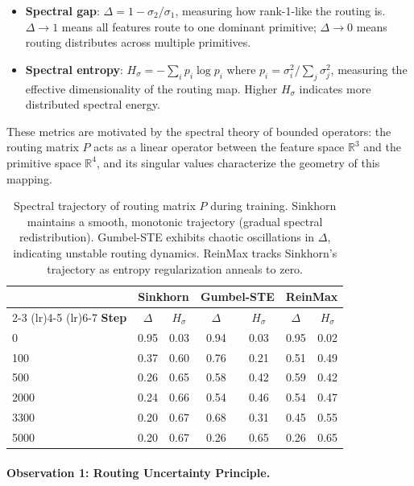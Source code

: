 \documentclass[Royal,times,sageh]{sagej}
\begin{document}
\begin{itemize}
    \item \textbf{Spectral gap}: $\Delta = 1 - \sigma_2 / \sigma_1$, measuring how rank-1-like the routing is. $\Delta \to 1$ means all features route to one dominant primitive; $\Delta \to 0$ means routing distributes across multiple primitives.
    \item \textbf{Spectral entropy}: $H_\sigma = -\sum_i p_i \log p_i$ where $p_i = \sigma_i^2 / \sum_j \sigma_j^2$, measuring the effective dimensionality of the routing map. Higher $H_\sigma$ indicates more distributed spectral energy.
\end{itemize}

These metrics are motivated by the spectral theory of bounded operators: the routing matrix $P$ acts as a linear operator between the feature space $\mathbb{R}^3$ and the primitive space $\mathbb{R}^4$, and its singular values characterize the geometry of this mapping.

\begin{table}[h]
\centering
\caption{Spectral trajectory of routing matrix $P$ during training. Sinkhorn maintains a smooth, monotonic trajectory (gradual spectral redistribution). Gumbel-STE exhibits chaotic oscillations in $\Delta$, indicating unstable routing dynamics. ReinMax tracks Sinkhorn's trajectory as entropy regularization anneals to zero.}
\label{tab:spectral_trajectory}
\small
\begin{tabular}{lcccccc}
\toprule
& \multicolumn{2}{c}{\textbf{Sinkhorn}} & \multicolumn{2}{c}{\textbf{Gumbel-STE}} & \multicolumn{2}{c}{\textbf{ReinMax}} \\
\cmidrule(lr){2-3} \cmidrule(lr){4-5} \cmidrule(lr){6-7}
\textbf{Step} & $\Delta$ & $H_\sigma$ & $\Delta$ & $H_\sigma$ & $\Delta$ & $H_\sigma$ \\
\midrule
0    & 0.95 & 0.03 & 0.94 & 0.03 & 0.95 & 0.02 \\
100  & 0.37 & 0.60 & 0.76 & 0.21 & 0.51 & 0.49 \\
500  & 0.26 & 0.65 & 0.58 & 0.42 & 0.59 & 0.42 \\
2000 & 0.24 & 0.66 & 0.54 & 0.46 & 0.54 & 0.47 \\
3300 & 0.20 & 0.67 & 0.68 & 0.31 & 0.45 & 0.55 \\
5000 & 0.20 & 0.67 & 0.26 & 0.65 & 0.26 & 0.65 \\
\bottomrule
\end{tabular}
\end{table}

\paragraph{Observation 1: Routing Uncertainty Principle.}
\end{document}
